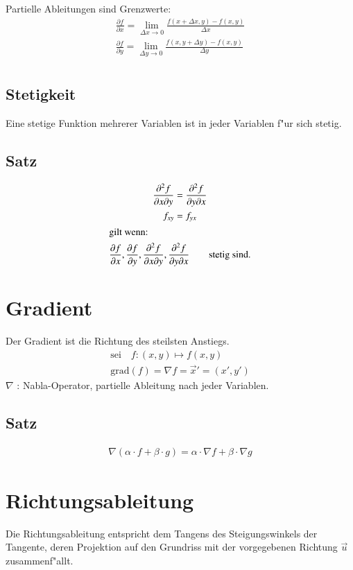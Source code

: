 Partielle Ableitungen sind Grenzwerte:
\begin{gather}
  \frac{\partial f}{\partial x} = \lim_{\Delta x \rightarrow 0}{\frac{f(x+\Delta x,y) - f(x,y)}{\Delta x}} \\
  \frac{\partial f}{\partial y} = \lim_{\Delta y \rightarrow 0}{\frac{f(x,y+\Delta y) - f(x,y)}{\Delta y}} \\
\end{gather}

\subsection{Stetigkeit}
Eine stetige Funktion mehrerer Variablen ist in jeder Variablen f"ur sich stetig.

\subsection{Satz}
\begin{gather}
  \frac{\partial^2 f}{\partial x\partial y} = \frac{\partial^2 f}{\partial y\partial x} \\
  f_{xy} = f_{yx} \\
\intertext{gilt wenn:}
  \frac{\partial f}{\partial x}, \frac{\partial f}{\partial y}, \frac{\partial^2 f}{\partial x\partial y},
	\frac{\partial^2 f}{\partial y\partial x} \qquad\text{stetig sind.}
\end{gather}


\section{Gradient}
Der Gradient ist die Richtung des steilsten Anstiegs.
\begin{gather}
  \text{sei}\quad f:(x,y)\longmapsto f(x,y) \\
  \text{grad}(f) = \nabla f = \overrightarrow{x}' = (x', y')
\end{gather}
$\nabla$ : Nabla-Operator, partielle Ableitung nach jeder Variablen.

\subsection{Satz}
\begin{gather}
  \nabla(\alpha\cdot f + \beta\cdot g) = \alpha\cdot\nabla f + \beta\cdot\nabla g
\end{gather}


\section{Richtungsableitung}
Die Richtungsableitung entspricht dem Tangens des Steigungswinkels der Tangente,
deren Projektion auf den Grundriss mit der vorgegebenen Richtung $\overrightarrow{u}$
zusammenf"allt.

